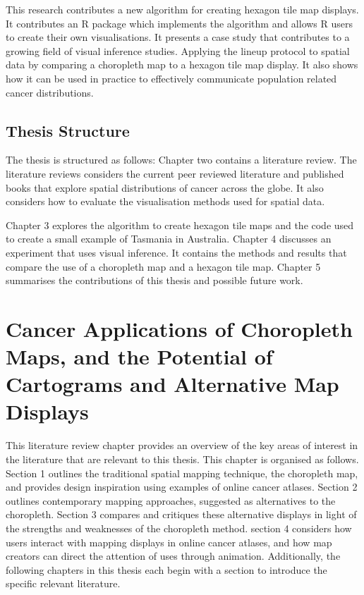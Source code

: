 \documentclass{monashthesis}
\begin{document}
This research contributes a new algorithm for creating hexagon tile map displays. It contributes an R \autocite{R} package which implements the algorithm and allows R users to create their own visualisations.
It presents a case study that contributes to a growing field of visual inference studies. Applying the lineup protocol to spatial data by comparing a choropleth map to a hexagon tile map display.
It also shows how it can be used in practice to effectively communicate population related cancer distributions.

\hypertarget{thesis-structure}{%
\section{Thesis Structure}\label{thesis-structure}}

The thesis is structured as follows: Chapter two contains a literature review.
The literature reviews considers the current peer reviewed literature and published books that explore spatial distributions of cancer across the globe.
It also considers how to evaluate the visualisation methods used for spatial data.

Chapter 3 explores the algorithm to create hexagon tile maps and the code used to create a small example of Tasmania in Australia.
Chapter 4 discusses an experiment that uses visual inference. It contains the methods and results that compare the use of a choropleth map and a hexagon tile map.
Chapter 5 summarises the contributions of this thesis and possible future work.

\hypertarget{literature}{%
\chapter{Cancer Applications of Choropleth Maps, and the Potential of Cartograms and Alternative Map Displays}\label{literature}}

This literature review chapter provides an overview of the key areas of interest in the literature that are relevant to this thesis. This chapter is organised as follows. Section 1 outlines the traditional spatial mapping technique, the choropleth map, and provides design inspiration using examples of online cancer atlases. Section 2 outlines contemporary mapping approaches, suggested as alternatives to the choropleth. Section 3 compares and critiques these alternative displays in light of the strengths and weaknesses of the choropleth method. section 4 considers how users interact with mapping displays in online cancer atlases, and how map creators can direct the attention of uses through animation. Additionally, the following chapters in this thesis each begin with a section to introduce the specific relevant literature.
\end{document}
